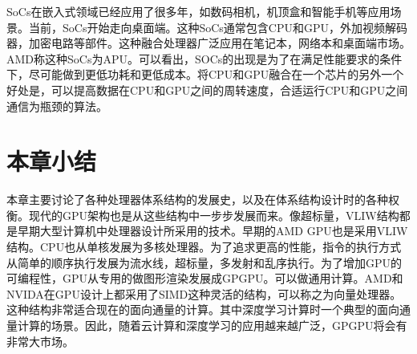 SoCs在嵌入式领域已经应用了很多年，如数码相机，机顶盒和智能手机等应用场景。当前，SoCs开始走向桌面端。这种SoCs通常包含CPU和GPU，外加视频解码器，加密电路等部件。这种融合处理器广泛应用在笔记本，网络本和桌面端市场。AMD称这种SoCs为APU。可以看出，SOCs的出现是为了在满足性能要求的条件下，尽可能做到更低功耗和更低成本。将CPU和GPU融合在一个芯片的另外一个好处是，可以提高数据在CPU和GPU之间的周转速度，合适运行CPU和GPU之间通信为瓶颈的算法。

\section{本章小结}
本章主要讨论了各种处理器体系结构的发展史，以及在体系结构设计时的各种权衡。现代的GPU架构也是从这些结构中一步步发展而来。像超标量，VLIW结构都是早期大型计算机中处理器设计所采用的技术。早期的AMD GPU也是采用VLIW结构。CPU也从单核发展为多核处理器。为了追求更高的性能，指令的执行方式从简单的顺序执行发展为流水线，超标量，多发射和乱序执行。为了增加GPU的可编程性，GPU从专用的做图形渲染发展成GPGPU。可以做通用计算。AMD和NVIDA在GPU设计上都采用了SIMD这种灵活的结构，可以称之为向量处理器。这种结构非常适合现在的面向通量的计算。其中深度学习计算时一个典型的面向通量计算的场景。因此，随着云计算和深度学习的应用越来越广泛，GPGPU将会有非常大市场。

